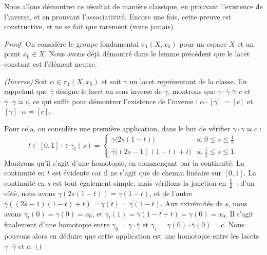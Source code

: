 Nous allons démontrer ce résultat de manière classique, en prouvant l'existence de l'inverse, et en prouvant l'associativité. Encore une fois, cette preuve est constructive, et ne se fait que rarement (voire jamais).

\begin{proof}
On considère le groupe fondamental $\pi_1(X,x_0)$ pour un espace $X$ et un point $x_0\in X$. Nous avons déjà démontré dans le lemme précédent que le lacet constant est l'élément neutre.

\bigskip \textit{(Inverse)} Soit $\alpha\in\pi_1(X,x_0)$ et soit $\gamma$ un lacet représentant de la classe. En rappelant que $\overline{\gamma}$ désigne le lacet en sens inverse de $\gamma$, montrons que $\gamma\cdot\overline{\gamma}\simeq c$ et $\overline{\gamma}\cdot\gamma\simeq c$, ce qui suffit pour démontrer l'existence de l'inverse : $\alpha\cdot [\overline{\gamma}]=[c]$ et $[\overline{\gamma}]\cdot \alpha=[c]$.

Pour cela, on considère une première application, dans le but de vérifier $\gamma\cdot \overline{\gamma}\simeq c$ : \[t\in[0,1]\mapsto\gamma_t(s)=\left\{\begin{matrix}
\gamma\big(2s(1-t)\big)&\text{si }0\leq s\leq \frac{1}{2}\\ 
\overline{\gamma}\big((2s-1)(1-t)+t\big)&\text{si }\frac{1}{2}\leq s\leq 1.
\end{matrix}\right.\]Montrons qu'il s'agit d'une homotopie, en commençant par la continuité. La continuité en $t$ est évidente car il ne s'agit que de chemin linéaire sur $[0,1]$. La continuité en $s$ est tout également simple, mais vérifions la jonction en $1\over2$ : d'un côté, nous avons $\gamma(2s(1-t))=\gamma(1-t)$, et de l'autre $\overline{\gamma}((2s-1)(1-t)+t)=\overline{\gamma}(t)=\gamma(1-t)$. Aux extrémités de $s$, nous avons $\gamma_t(0)=\gamma(0)=x_0$, et $\gamma_t(1)=\overline{\gamma}(1-t+t)=\gamma(0)=x_0$. Il s'agit finalement d'une homotopie entre $\gamma_0=\gamma\cdot \overline{\gamma}$ et $\gamma_1=\gamma(0)\cdot\overline{\gamma}(0)=c$. %
Nous pouvons alors en déduire que cette application est une homotopie entre les lacets $\gamma\cdot\overline{\gamma}$ et $c$.


\end{proof}
